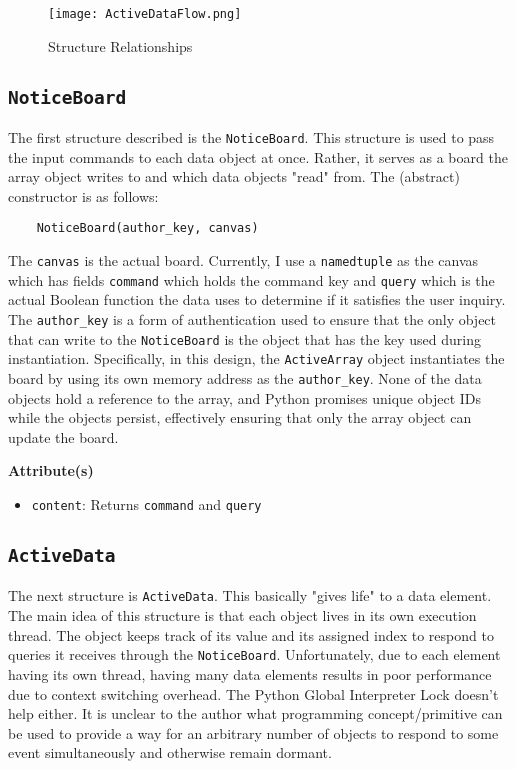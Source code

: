 \documentclass[10pt]{article}
\begin{document}
	\begin{figure}[htbp]
		\centering
		\texttt{[image: ActiveDataFlow.png]}
		\caption{Structure Relationships}
		\label{fig:relationships}
	\end{figure}

\subsection{\lstinline|NoticeBoard|}
	The first structure described is the \lstinline|NoticeBoard|. This structure is used to pass the input commands to each data object at once. Rather, it serves as a board the array object writes to and which data objects "read" from. 
	The (abstract) constructor is as follows:
	
	\begin{lstlisting}
	NoticeBoard(author_key, canvas)
	\end{lstlisting}
	
	The \lstinline|canvas| is the actual board. Currently, I use a \lstinline|namedtuple| as the canvas which has fields \lstinline|command| which holds the command key and \lstinline|query| which is the actual Boolean function the data uses to determine if it satisfies the user inquiry. The \lstinline|author_key| is a form of authentication used to ensure that the only object that can write to the \lstinline|NoticeBoard| is the object that has the key used during instantiation. Specifically, in this design, the \lstinline|ActiveArray| object instantiates the board by using its own memory address as the \lstinline|author_key|. None of the data objects hold a reference to the array, and Python promises unique object IDs while the objects persist, effectively ensuring that only the array object can update the board.
	
	\noindent\textbf{Attribute(s)}
	
	\begin{itemize}
		\item \lstinline|content|: Returns \lstinline|command| and \lstinline|query|
	\end{itemize}
	
\subsection{\lstinline|ActiveData|}
	The next structure is \lstinline|ActiveData|. This basically "gives life" to a data element. The main idea of this structure is that each object lives in its own execution thread. The object keeps track of its value and its assigned index to respond to queries it receives through the \lstinline|NoticeBoard|. Unfortunately, due to each element having its own thread, having many data elements results in poor performance due to context switching overhead. The Python Global Interpreter Lock doesn't help either. It is unclear to the author what programming concept/primitive can be used to provide a way for an arbitrary number of objects to respond to some event simultaneously and otherwise remain dormant.
\end{document}
